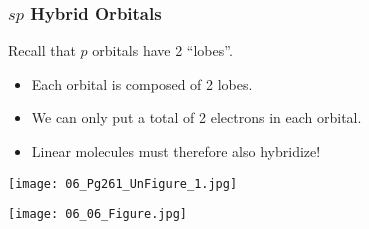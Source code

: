 \documentclass[handout]{beamer}
\begin{document}
\begin{frame}[allowframebreaks]
	\frametitle{$sp$ Hybrid Orbitals}

	Recall that $p$ orbitals have 2 ``lobes''.
	\begin{itemize}
		\item Each \alert{orbital} is composed of 2 lobes.
		\item We can \alert{only} put a total of 2 electrons in each
			\alert{orbital}.
		\item Linear molecules must therefore also hybridize!
	\end{itemize}

	\bigskip

	\begin{center}
		\texttt{[image: 06\_Pg261\_UnFigure\_1.jpg]}
	\end{center}

	\framebreak

	\begin{center}
		\texttt{[image: 06\_06\_Figure.jpg]}
	\end{center}
\end{frame}


\end{document}
